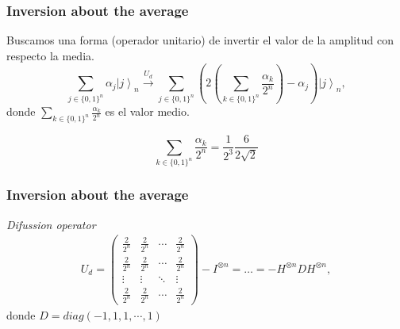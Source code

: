 \begin{frame}
	\frametitle{Inversion about the average}
	Buscamos una forma (operador unitario) de invertir el valor de la amplitud con respecto la media.
	\begin{equation*}
		\sum_{j\in\{0,1\}^{n}}\alpha_{j}\left.|j\right\rangle _{n}\stackrel{U_d}{\longrightarrow}\sum_{j\in\{0,1\}^{n}}\left(2\left(\sum_{k\in\{0,1\}^{n}}\frac{\alpha_{k}}{2^{n}}\right)-\alpha_{j}\right)\left.|j\right\rangle _{n},
	\end{equation*}
	donde $\sum_{k\in\{0,1\}^{n}}\frac{\alpha_{k}}{2^{n}}$ es el valor medio.
	\begin{exampleblock}{}
		\[\sum_{k\in\{0,1\}^{n}}\frac{\alpha_{k}}{2^{n}}=\frac{1}{2^3}\frac{6}{2\sqrt{2}}\]
	\end{exampleblock}
\end{frame}
\begin{frame}
	\frametitle{Inversion about the average}
	\begin{block}{\textit{Difussion operator}}
		\begin{eqnarray}
			U_{d}=\left(\begin{array}{cccc}
			\frac{2}{2^{n}} & \frac{2}{2^{n}} & \cdots & \frac{2}{2^{n}}\\
			\frac{2}{2^{n}} & \frac{2}{2^{n}} & \cdots & \frac{2}{2^{n}}\\
			\vdots & \vdots & \ddots & \vdots\\
			\frac{2}{2^{n}} & \frac{2}{2^{n}} & \cdots & \frac{2}{2^{n}}
			\end{array}\right)-I^{\otimes n}=\dots=-H^{\otimes n}DH^{\otimes n},
		\end{eqnarray}
		donde $D=diag\left(-1,1,1,\cdots,1\right)$
	\end{block}
\end{frame}

